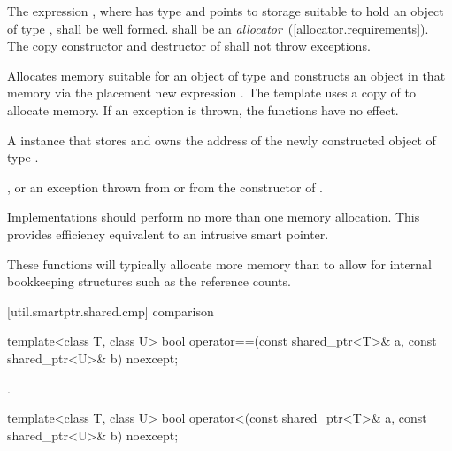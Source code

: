 \begin{itemdescr}
\pnum
\requires The expression ,
where  has type  and points to storage suitable
to hold an object of type , shall be well formed.  shall
be an \textit{allocator}~(\ref{allocator.requirements}). The copy constructor
and destructor of  shall not throw exceptions.

\pnum
\effects Allocates memory suitable for an object of type 
and constructs an object in that memory via the placement new expression
.
The template  uses a copy of  to
allocate memory. If an exception is thrown, the functions have no effect.

\pnum
\returns A  instance that stores and owns
the address of the newly constructed object of type .

\pnum
\postconditions {}

\pnum
\throws {}, or an exception thrown from
 or from the constructor of .

\pnum
\notes Implementations should
perform no more than one memory allocation. \enternote This provides
efficiency equivalent to an intrusive smart pointer. \exitnote

\pnum
\enternote These functions will typically allocate more memory
than  to allow for internal bookkeeping structures such
as the reference counts. \exitnote
\end{itemdescr}

[util.smartptr.shared.cmp]{ comparison}

%
%
\begin{itemdecl}
template<class T, class U> bool operator==(const shared_ptr<T>& a, const shared_ptr<U>& b) noexcept;
\end{itemdecl}

\begin{itemdescr}
\pnum\returns  {}.
\end{itemdescr}

%
%
\begin{itemdecl}
template<class T, class U> bool operator<(const shared_ptr<T>& a, const shared_ptr<U>& b) noexcept;
\end{itemdecl}

